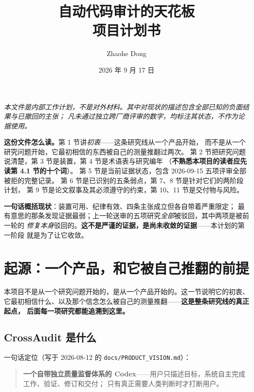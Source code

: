 \documentclass[11pt,a4paper]{article}
\title{\vspace{-1.6cm}\textbf{自动代码审计的天花板}\\[0.3em]
\large 项目计划书}
\author{Zhaohe Dong}
\date{2026 年 9 月 17 日}
\begin{document}
\maketitle
\vspace{-0.8cm}

\begin{center}
\begin{minipage}{0.92\textwidth}
\small\itshape
本文件是内部工作计划，不是对外材料。其中对现状的描述包含全部已知的负面结果与已撤回的主张；
凡未通过独立跨厂商评审的数字，均标注其状态，不作为论据使用。
\end{minipage}
\end{center}
\vspace{0.5cm}

\noindent\textbf{这份文件怎么读。}第 1 节讲\emph{初衷}——这条研究线从一个产品开始，
而不是从一个研究问题开始，它最初相信的东西被自己的测量推翻过两次。
第 2 节把研究问题说清楚，第 3 节是装置，第 4 节是术语表与研究编年
（\textbf{不熟悉本项目的读者应先读第 4.1 节的十个词}）。
第 5 节是当前证据状态，包含 2026-09-15 五项评审全部被拒的完整记录。
第 6 节是已识别的五条弱点，第 7、8 节是针对它们的两阶段计划，
第 9 节是论文叙事及其必须遵守的约束，第 10、11 节是交付物与风险。

\vspace{0.3cm}
\noindent\textbf{一句话概括现状}：装置可用、纪律有效、四条主张成立但各自带着严重限定；
最有意思的那条发现证据最弱；上一轮送审的五项研究\emph{全部}被驳回，其中两项是被前一轮的
\emph{修复本身}驳回的。\textbf{这不是严谨的证据，是尚未收敛的证据}——本计划的第一阶段
就是为了让它收敛。
\vspace{0.4cm}

\section{起源：一个产品，和它被自己推翻的前提}

本项目不是从一个研究问题开始的，是从一个产品开始的。这一节说明它的初衷、
它最初相信什么、以及那个信念怎么被自己的测量推翻——\textbf{这是整条研究线的真正起点，
后面每一项研究都能追溯到这里。}

\subsection{CrossAudit 是什么}

一句话定位（写于 2026-08-12 的 \texttt{docs/PRODUCT\_VISION.md}）：

\begin{quote}
\textbf{一个自带独立质量监督体系的 Codex}——用户只描述目标，系统自主完成工作、验证、修订和交付；
只有真正需要人类判断时才打断用户。
\end{quote}
\end{document}
